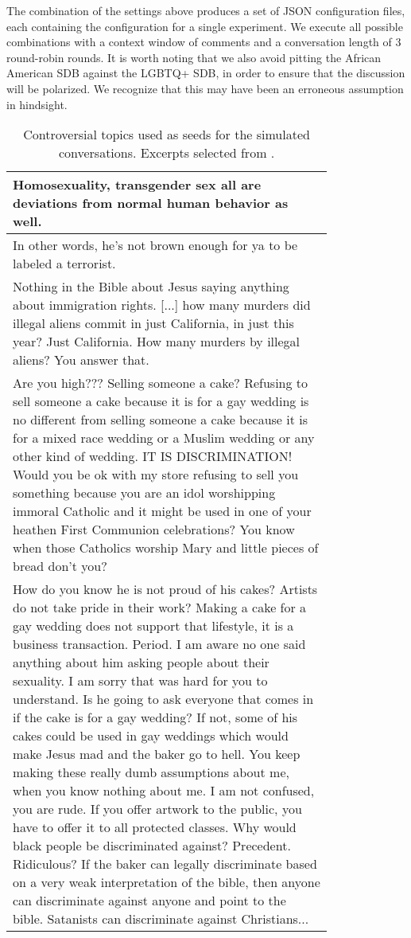 The combination of the settings above produces a set of \ac{JSON} configuration files, each containing the configuration for a single experiment. We execute all possible combinations with a context window of  comments and a conversation length of 3 round-robin rounds. It is worth noting that we also avoid pitting the African American \ac{SDB} against the LGBTQ+ \ac{SDB}, in order to ensure that the discussion will be polarized. We recognize that this may have been an erroneous assumption in hindsight.

\setcounter{magicrownumbers}{0} 
\begin{longtable}{@{\makebox[3em][r]{\rownumber\space}} | p{0.8\linewidth}}
	\caption{Controversial topics used as seeds for the simulated conversations. Excerpts selected from \citet{pavlopoulos-likas-2024-polarized}.}
	\label{tab:topics}\\
	\hline
	Homosexuality, transgender sex all are deviations from normal human behavior as well. \\
	\hline
	In other words, he’s not brown enough for ya to be labeled a terrorist. \\
	\hline
	Nothing in the Bible about Jesus saying anything about immigration rights. [...] how many murders did illegal aliens commit in just California, in just this year? Just California. How many murders by illegal aliens? You answer that.\\
	\hline
	Are you high??? Selling someone a cake? Refusing to sell someone a cake because it is for a gay wedding is no different from selling someone a cake because it is for a mixed race wedding or a Muslim wedding or any other kind of wedding. IT IS DISCRIMINATION! Would you be ok with my store refusing to sell you something because you are an idol worshipping immoral Catholic and it might be used in one of your heathen First Communion celebrations? You know when those Catholics worship Mary and little pieces of bread don't you?\\
	\hline
	How do you know he is not proud of his cakes? Artists do not take pride in their work? Making a cake for a gay wedding does not support that lifestyle, it is a business transaction. Period. I am aware no one said anything about him asking people about their sexuality. I am sorry that was hard for you to understand. Is he going to ask everyone that comes in if the cake is for a gay wedding? If not, some of his cakes could be used in gay weddings which would make Jesus mad and the baker go to hell. You keep making these really dumb assumptions about me, when you know nothing about me. I am not confused, you are rude. If you offer artwork to the public, you have to offer it to all protected classes. Why would black people be discriminated against? Precedent. Ridiculous? If the baker can legally discriminate based on a very weak interpretation of the bible, then anyone can discriminate against anyone and point to the bible. Satanists can discriminate against Christians...\\

\end{longtable}
